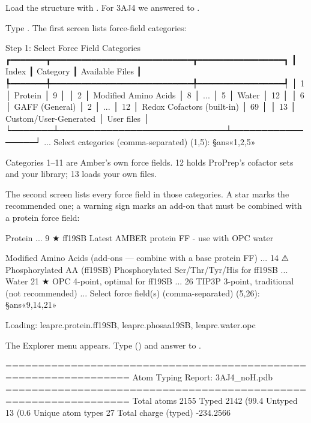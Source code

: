 \begin{steps}
  \item Load the structure with . For 3AJ4 we answered  to
        .
  \item Type . The first screen lists force-field categories:
\begin{screen}
         Step 1: Select Force Field Categories
┏━━━━━━━┳━━━━━━━━━━━━━━━━━━━━━━━━━━━━┳━━━━━━━━━━━━━━━━━┓
┃ Index ┃ Category                   ┃ Available Files ┃
┡━━━━━━━╇━━━━━━━━━━━━━━━━━━━━━━━━━━━━╇━━━━━━━━━━━━━━━━━┩
│ 1     │ Protein                    │               9 │
│ 2     │ Modified Amino Acids       │               8 │
...
│ 5     │ Water                      │              12 │
│ 6     │ GAFF (General)             │               2 │
...
│ 12    │ Redox Cofactors (built-in) │              69 │
│ 13    │ Custom/User-Generated      │      User files │
└───────┴────────────────────────────┴─────────────────┘
...
Select categories (comma-separated) (1,5): §ans«1,2,5»
\end{screen}
        Categories 1--11 are Amber's own force fields. 12 holds ProPrep's
        cofactor sets and your library; 13 loads your own files.
  \item The second screen lists every force field in those categories. A
        star marks the recommended one; a warning sign marks an add-on that
        must be combined with a protein force field:
\begin{screen}
Protein
...
    9 ★ ff19SB                     Latest AMBER protein FF - use with OPC water

Modified Amino Acids  (add-ons — combine with a base protein FF)
...
   14 ⚠ Phosphorylated AA (ff19SB) Phosphorylated Ser/Thr/Tyr/His for ff19SB
...
Water
   21 ★ OPC                        4-point, optimal for ff19SB
...
   26   TIP3P                      3-point, traditional (not recommended)
...
Select force field(s) (comma-separated) (5,26): §ans«9,14,21»

Loading: leaprc.protein.ff19SB, leaprc.phosaa19SB, leaprc.water.opc
\end{screen}
  \item The Explorer menu appears. Type 
        () and answer
         to .
\begin{screen}
=================================================================
  Atom Typing Report: 3AJ4_noH.pdb
=================================================================
  Total atoms             2155
  Typed                   2142 (99.4%
  Untyped                 13 (0.6%
  Unique atom types       27
  Total charge (typed)    -234.2566


\end{screen}
\end{steps}
